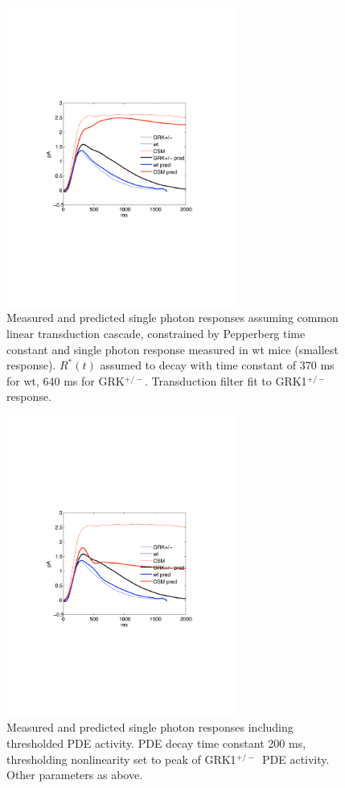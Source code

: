 \documentclass[12pt]{article}
\def\RKHET{GRK1$^{+/-}$}
\begin{document}
\begin{figure}[h]
\begin{center}
\includegraphics[width=3in]{linearity.pdf}
\caption{Measured and predicted single photon responses assuming common linear transduction cascade, constrained by Pepperberg time constant and single photon response measured in wt mice (smallest response).  $R^*(t)$ assumed to decay with time constant of 370 ms for wt, 640 ms for GRK$^{+/-}$.  Transduction filter fit to \RKHET response.}  
\label{fig:linear-predict}
\end{center}
\end{figure}

\begin{figure}[h]
\begin{center}
\includegraphics[width=3in]{nonlinearity.pdf}
\caption{Measured and predicted single photon responses including thresholded PDE activity.  PDE decay time constant 200 ms, thresholding nonlinearity set to peak of \RKHET~PDE activity.  Other parameters as above.}
\label{fig:nonlinear-predict}
\end{center}
\end{figure}
\end{document}
